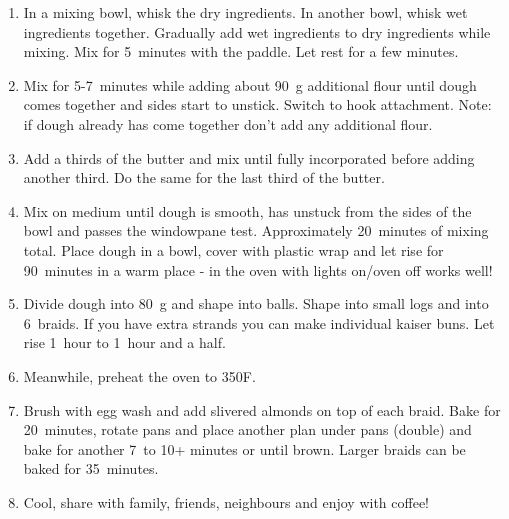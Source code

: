 \begin{enumerate}
    \item In a mixing bowl, whisk the dry ingredients. In another bowl, whisk wet ingredients together. Gradually add wet ingredients to dry ingredients while mixing. Mix for 5~minutes with the paddle. Let rest for a few minutes.
    \item Mix for 5-7~minutes while adding about 90~g additional flour until dough comes together and sides start to unstick. Switch to hook attachment. Note: if dough already has come together don't add any additional flour.
    \item Add a thirds of the butter and mix until fully incorporated before adding another third. Do the same for the last third of the butter.
    \item Mix on medium until dough is smooth, has unstuck from the sides of the bowl and passes the windowpane test. Approximately 20~minutes of mixing total. Place dough in a bowl, cover with plastic wrap and let rise for 90~minutes in a warm place - in the oven with lights on/oven off works well!
    \item Divide dough into 80~g and shape into balls. Shape into small logs and into 6~braids. If you have extra strands you can make individual kaiser buns. Let rise 1~hour to 1~hour and a half.
    \item Meanwhile, preheat the oven to 350\degree F.
    \item Brush with egg wash and add slivered almonds on top of each braid. Bake for 20~minutes, rotate pans and place another plan under pans (double) and bake for another 7~to 10+ minutes or until brown. Larger braids can be baked for 35~minutes.
    \item Cool, share with family, friends, neighbours and enjoy with coffee!
\end{enumerate}


